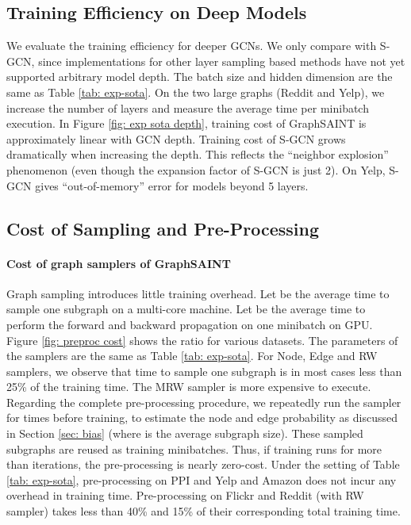 \documentclass{article} \usepackage{iclr2020_conference,times}
\newcommand{\graphsaint}{{\fontfamily{lmtt}\selectfont GraphSAINT}}
\begin{document}
\subsection{Training Efficiency on Deep Models}
\label{appendix: depth}
We evaluate the training efficiency for deeper GCNs. 
We only compare with S-GCN, since implementations for other layer sampling based methods have not yet supported arbitrary model depth. 
The batch size and hidden dimension are the same as Table \ref{tab: exp-sota}. 
On the two large graphs (Reddit and Yelp), we increase the number of layers and measure the average time per minibatch execution. In Figure \ref{fig: exp sota depth}, training cost of {\graphsaint} is approximately linear with GCN depth. Training cost of S-GCN grows dramatically when increasing the depth. This reflects the ``neighbor explosion'' phenomenon (even though the expansion factor of S-GCN is just 2). On Yelp, S-GCN gives ``out-of-memory'' error for models beyond 5 layers.


\subsection{Cost of Sampling and Pre-Processing}
\label{appendix: sampler cost}

\paragraph{Cost of graph samplers of {\graphsaint}} Graph sampling introduces little training overhead.
Let  be the average time to sample one subgraph on a multi-core machine. Let  be the average time to perform the forward and backward propagation on one minibatch on GPU. 
Figure \ref{fig: preproc cost} shows the ratio  for various datasets. The parameters of the samplers are the same as Table \ref{tab: exp-sota}. For Node, Edge and RW samplers, we observe that time to sample one subgraph is in most cases less than 25\% of the training time. 
The MRW sampler is more expensive to execute. 
Regarding the complete pre-processing procedure, we repeatedly run the sampler for  times before training, to estimate the node and edge probability as discussed in Section \ref{sec: bias} (where  is the average subgraph size). These sampled subgraphs are reused as training minibatches. Thus, if training runs for more than  iterations, the pre-processing is nearly zero-cost. 
Under the setting of Table \ref{tab: exp-sota}, pre-processing on PPI and Yelp and Amazon does not incur any overhead in training time. Pre-processing on Flickr and Reddit (with RW sampler) takes less than 40\% and 15\% of their corresponding total training time. 
\end{document}
